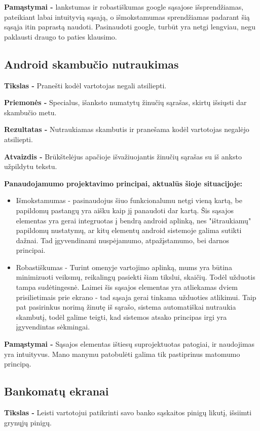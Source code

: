 ﻿\documentclass[a4paper, 12pt]{article}
\begin{document}
		\textbf{Pamąstymai -}
		lankstumas ir robastiškumas google sąsajose išsprendžiamas, pateikiant labai intuityvią sąsają, o išmokstamumas sprendžiamas padarant šią sąsąja itin paprastą naudoti.
		Pasinaudoti google, turbūt yra netgi lengviau, negu paklausti draugo to paties klausimo.

	\subsection{Android skambučio nutraukimas}
		\textbf{Tikslas -}
		Pranešti kodėl vartotojas negali atsiliepti.

		\textbf{Priemonės -}
		Specialus, išanksto numatytų žinučių sąrašas, skirtų išsiųsti dar skambučio metu.

		\textbf{Rezultatas -}
		Nutraukiamas skambutis ir pranešama kodėl vartotojas negalėjo atsiliepti.

		\textbf{Atvaizdis -}
		Brūkštelėjus apačioje išvažiuojantis žinučių sąrašas su iš anksto užpildytu tekstu.

		\textbf{Panaudojamumo projektavimo principai, aktualūs šioje situacijoje:}
		\begin{itemize}
		\item Išmokstamumas - pasinaudojus šiuo funkcionalumu netgi vieną kartą, be papildomų pastangų yra aišku kaip jį panaudoti dar kartą.
		Šis sąsajos elementas yra gerai integruotas į bendrą android aplinką, nes "ištraukiamų" papildomų nustatymų, ar kitų elementų android sistemoje galima sutikti dažnai.
		Tad įgyvendinami nuspėjamumo, atpažįstamumo, bei darnos principai.
		\item Robastiškumas - Turint omenyje vartojimo aplinką, mums yra būtina minimizuoti veiksmų, reikalingų pasiekti šiam tikslui, skaičių.
		Todėl užduotis tampa sudėtingesnė.
		Laimei šis sąsajos elementas yra atliekamas dviem prisilietimais prie ekrano - tad sąsaja gerai tinkama užduoties atlikimui.
		Taip pat pasirinkus norimą žinutę iš sąrašo, sistema automatiškai nutraukia skambutį, todėl galime teigti, kad sistemos atsako principas irgi yra įgyvendintas sėkmingai.
		\end{itemize}

		\textbf{Pamąstymai -}
		Sąsajos elementas ištiesų suprojektuotas patogiai, ir naudojimas yra intuityvus.
		Mano manymu patobulėti galima tik pastiprinus matomumo principą. 
	
	\subsection{Bankomatų ekranai}
		\textbf{Tikslas -}
		Leisti vartotojui patikrinti savo banko sąskaitos pinigų likutį, išsiimti grynųjų pinigų.
\end{document}
